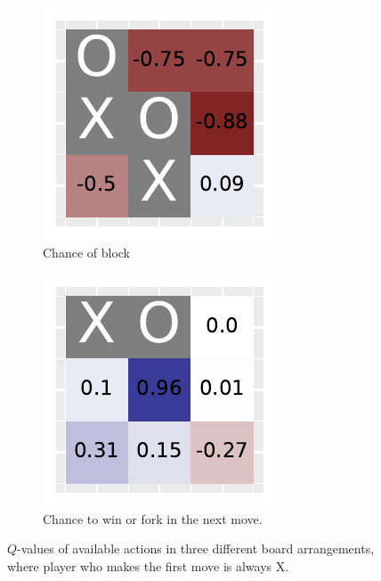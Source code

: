 \documentclass[10pt]{IEEEtran}
\begin{document}
\begin{figure}[h]
\begin{subfigure}[t]{0.32\linewidth}
         \includegraphics[width=\linewidth]{code/figures/heatmap_1.pdf}
         \caption{Chance of block}
         \label{fig_heatmap_2}
     \end{subfigure}
     \hfill
     \begin{subfigure}[t]{0.32\linewidth}
         \centering
         \includegraphics[width=\linewidth]{code/figures/heatmap_2.pdf}
         \caption{Chance to win or fork in the next move.}
         \label{fig_heatmap_3}
     \end{subfigure}
        \caption{$Q$-values of available actions in three different board arrangements, where player who makes the first move is always X.}
        \label{plot_question_10}
\end{figure}
\end{document}
